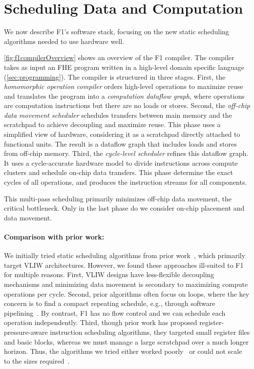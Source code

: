 \section{Scheduling Data and Computation}\label{sec:f1_scheduler}

We now describe F1's software stack, focusing on the new static scheduling
algorithms needed to use hardware well.

\figFOneCompilerOverview

\autoref{fig:f1compilerOverview} shows an overview of the F1 compiler. The
compiler takes as input an FHE program written in a high-level domain specific
language (\autoref{sec:programming}). The compiler is structured in three
stages. First, the \emph{homomorphic operation compiler} orders high-level
operations to maximize reuse and translates the program into a
\emph{computation dataflow graph}, where operations are computation
instructions but there are no loads or stores. Second, the \emph{off-chip data
movement scheduler} schedules transfers between main memory and the scratchpad
to achieve decoupling and maximize reuse. This phase uses a simplified view of
hardware, considering it as a scratchpad directly attached to functional units.
The result is a dataflow graph that includes loads and stores from off-chip
memory. Third, the \emph{cycle-level scheduler} refines this dataflow graph. It
uses a cycle-accurate hardware model to divide instructions across compute
clusters and schedule on-chip data transfers. This phase determine the exact
cycles of all operations, and produces the instruction streams for all
components.

This multi-pass scheduling primarily minimizes off-chip data movement, the
critical bottleneck. Only in the last phase do we consider on-chip placement
and data movement.

\paragraph{Comparison with prior work:}
We initially tried static sched\-uling algorithms from prior
work~\cite{blelloch:acm1999:provably,marchal:jpdc2019:limiting,goodman:ics1988:code,ozer:micro1998:unified,barany:odes2011:register},
which primarily target VLIW architectures. However, we found these approaches
ill-suited to F1 for multiple reasons. First, VLIW designs have less-flexible
decoupling mechanisms and minimizing data movement is secondary to maximizing
compute operations per cycle. Second, prior algorithms often focus on loops,
where the key concern is to find a compact repeating schedule, e.g., through
software pipelining~\cite{lam1989software}. By contrast, F1 has no flow control
and we can schedule each operation independently. Third, though prior work has
proposed register-pressure-aware instruction scheduling algorithms, they
targeted small register files and basic blocks, whereas we must manage a large
scratchpad over a much longer horizon. Thus, the algorithms we tried either
worked poorly~\cite{ozer:micro1998:unified, goodman:ics1988:code,
marchal:jpdc2019:limiting} or could not scale to the sizes
required~\cite{barany:odes2011:register, xu:sigplan2007:tetris,
touati:ijpp2005:register, berson:pact1993:ursa}.

